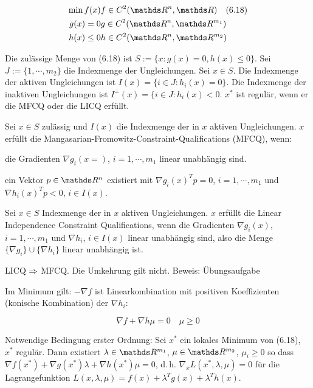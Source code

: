 \begin{align*}
\min f(x) & f \in C^2(\R^n, \R) \quad (6.18)\\
g(x)=0 & g \in C^2(\R^n, \R^{m_1}) \\
h(x) \leq 0 & h \in C^2(\R^n, \R^{m_2}) \\
\end{align*}

Die zulässige Menge von (6.18) ist $S := \{x: g(x)=0, h(x) \leq 0 \}$. Sei $J := \{1,\cdots,m_2\}$ die Indexmenge der Ungleichungen. Sei $x \in S$. Die Indexmenge der aktiven Ungleichungen ist $I(x) = \{i\in J : h_i(x) = 0\}$. Die Indexmenge der inaktiven Ungleichungen ist $I^\perp (x) = \{ i \in J: h_i(x) < 0$. $x^*$ ist regulär, wenn er die MFCQ oder die LICQ erfüllt.


Sei $x \in S$ zulässig und $I(x)$ die Indexmenge der in $x$ aktiven Ungleichungen. $x$ erfüllt die Mangasarian-Fromowitz-Constraint-Qualifications (MFCQ), wenn:

\bitm
\item die Gradienten $\nabla g_i(x=)$, $i=1,\cdots, m_1$ linear unabhängig sind.
\item ein Vektor $p \in \R^n$ existiert mit $\nabla g_i(x)^T p = 0$, $i=1,\cdots,m_1$ und $\nabla h_i(x)^T p < 0$, $i \in I(x)$.
\eitm


Sei $x\in S$ Indexmenge der in $x$ aktiven Ungleichungen. $x$ erfüllt die Linear Independence Constraint Qualifications, wenn die Gradienten $\nabla g_i(x)$, $i=1,\cdots,m_1$ und $\nabla h_i$, $i \in I(x)$ linear unabhängig sind, also die Menge $\{ \nabla g_i \} \cup \{ \nabla h_i \}$ linear unabhängig ist.


LICQ $\Rightarrow$ MFCQ. Die Umkehrung gilt nicht. Beweis: Übungsaufgabe

Im Minimum gilt: $-\nabla f$ ist Linearkombination mit positiven Koeffizienten (konische Kombination) der $\nabla h_i$:

\[ \nabla f + \nabla h \mu = 0 \quad \mu \geq 0 \]


\bitm
\item Notwendige Bedingung erster Ordnung: Sei $x^*$ ein lokales Minimum von (6.18), $x^*$ regulär. Dann existiert $\lambda \in \R^{m_1}$, $\mu \in \R^{m_2}$, $\mu_i \geq 0$ so dass $\nabla f(x^*) + \nabla g(x^*) \lambda + \nabla h(x^*) \mu = 0$, d.\,h. $\nabla_x L(x^*, \lambda, \mu) = 0$ für die Lagrangefunktion $L(x,\lambda, \mu) = f(x) + \lambda^T g(x) + \lambda^T h(x)$.

